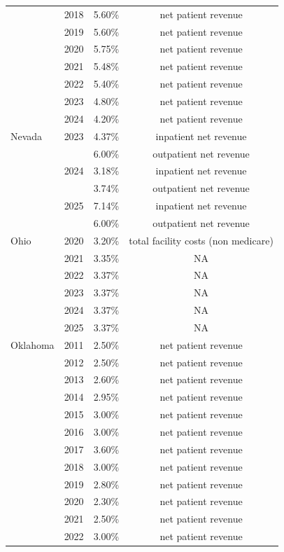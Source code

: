 \begin{longtable}{llcc}
 & 2018 & 5.60\% & net patient revenue \\[0pt]
 & 2019 & 5.60\% & net patient revenue \\[0pt]
 & 2020 & 5.75\% & net patient revenue \\[0pt]
 & 2021 & 5.48\% & net patient revenue \\[0pt]
 & 2022 & 5.40\% & net patient revenue \\[0pt]
 & 2023 & 4.80\% & net patient revenue \\[0pt]
 & 2024 & 4.20\% & net patient revenue \\[0pt]
\midrule
Nevada & 2023 & 4.37\% & inpatient net revenue \\[0pt]
 &  & 6.00\% & outpatient net revenue \\[0pt]
 & 2024 & 3.18\% & inpatient net revenue \\[0pt]
 &  & 3.74\% & outpatient net revenue \\[0pt]
 & 2025 & 7.14\% & inpatient net revenue \\[0pt]
 &  & 6.00\% & outpatient net revenue \\[0pt]
\midrule
Ohio & 2020 & 3.20\% & total facility costs (non medicare) \\[0pt]
 & 2021 & 3.35\% & NA \\[0pt]
 & 2022 & 3.37\% & NA \\[0pt]
 & 2023 & 3.37\% & NA \\[0pt]
 & 2024 & 3.37\% & NA \\[0pt]
 & 2025 & 3.37\% & NA \\[0pt]
\midrule
Oklahoma & 2011 & 2.50\% & net patient revenue \\[0pt]
 & 2012 & 2.50\% & net patient revenue \\[0pt]
 & 2013 & 2.60\% & net patient revenue \\[0pt]
 & 2014 & 2.95\% & net patient revenue \\[0pt]
 & 2015 & 3.00\% & net patient revenue \\[0pt]
 & 2016 & 3.00\% & net patient revenue \\[0pt]
 & 2017 & 3.60\% & net patient revenue \\[0pt]
 & 2018 & 3.00\% & net patient revenue \\[0pt]
 & 2019 & 2.80\% & net patient revenue \\[0pt]
 & 2020 & 2.30\% & net patient revenue \\[0pt]
 & 2021 & 2.50\% & net patient revenue \\[0pt]
 & 2022 & 3.00\% & net patient revenue \\[0pt]

\end{longtable}
